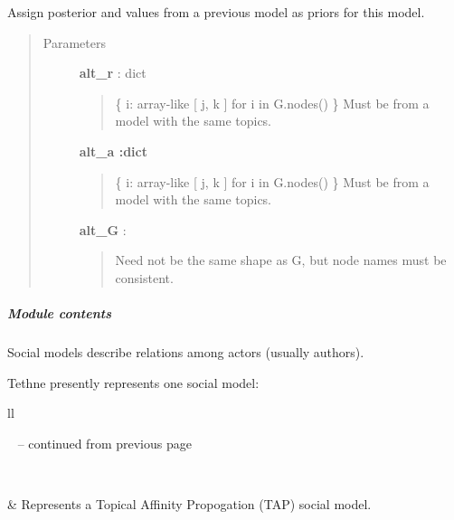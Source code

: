 \documentclass[letterpaper,10pt,english]{sphinxmanual}
\begin{document}
\begin{fulllineitems}
\begin{fulllineitems}
\label{tethne.model.social.tapmodel:tethne.model.social.tapmodel.TAPModel.prime}
Assign posterior  and  values from a previous model as priors
for this model.
\begin{quote}\begin{description}
\item[{Parameters}] \leavevmode
\textbf{alt\_r} : dict
\begin{quote}

\{ i: array-like {[} j, k {]} for i in G.nodes() \}
Must be from a model with the same topics.
\end{quote}

\textbf{alt\_a :dict}
\begin{quote}

\{ i: array-like {[} j, k {]} for i in G.nodes() \}
Must be from a model with the same topics.
\end{quote}

\textbf{alt\_G} : 
\begin{quote}

Need not be the same shape as G, but node names must be consistent.
\end{quote}

\end{description}\end{quote}

\end{fulllineitems}


\end{fulllineitems}



\subparagraph{Module contents}
\label{tethne.model.social:module-tethne.model.social}\label{tethne.model.social:module-contents}
Social models describe relations among actors (usually authors).

Tethne presently represents one social model:

\begin{longtable}{ll}
\hline
\endfirsthead

%
{{\textsf{\tablename\ \thetable{} -- continued from previous page}}} \\
\hline
\endhead

\hline {} \\ \hline
\endfoot

\endlastfoot


{\hyperref[tethne.model.social.tapmodel:tethne.model.social.tapmodel.TAPModel]{}}
 & 
Represents a Topical Affinity Propogation (TAP) social model.
\\
\hline\end{longtable}
\end{document}
